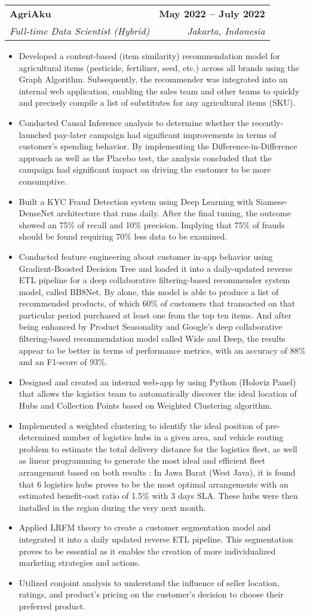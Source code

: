 \documentclass[letterpaper,11pt]{article}
\makeatletter
\newcommand{\resumeItem}[1]{
	\item\small{
		{#1 \vspace{-2pt}}
	}
}
\newcommand{\resumeSubheading}[4]{
	\vspace{-2pt}\item
	\begin{tabular*}{1.0\textwidth}[t]{l@{\extracolsep{\fill}}r}
		\textbf{#1} & \textbf{\small #2} \\
		\textit{\small#3} & \textit{\small #4} \\
	\end{tabular*}\vspace{-7pt}
}
\newcommand{\resumeItemListStart}{\begin{itemize}}
\newcommand{\resumeItemListEnd}{\end{itemize}\vspace{-5pt}}
\makeatother
\begin{document}
	\resumeSubheading
	{AgriAku}{May 2022 -- July 2022}
	{Full-time Data Scientist (Hybrid)}{Jakarta, Indonesia}
	\resumeItemListStart
	\resumeItem{Developed a content-based (item similarity) recommendation model for agricultural items (pesticide, fertilizer, seed, etc.) across all brands using the Graph Algorithm. Subsequently, the recommender was integrated into an internal web application, enabling the sales team and other teams to quickly and precisely compile a list of substitutes for any agricultural items (SKU). }
	\resumeItem{Conducted Causal Inference analysis to determine whether the recently-launched pay-later campaign had significant improvements in terms of customer's spending behavior. By implementing the Difference-in-Difference approach as well as the Placebo test, the analysis concluded that the campaign had significant impact on driving the customer to be more consumptive.}
	\resumeItem{Built a KYC Fraud Detection system using Deep Learning with Siamese-DenseNet architecture that runs daily. After the final tuning, the outcome showed an 75\% of recall and 10\% precision. Implying that 75\% of frauds should be found requiring 70\% less data to be examined.}
	\resumeItem{Conducted feature engineering about customer in-app behavior using Gradient-Boosted Decision Tree and loaded it into a daily-updated reverse ETL pipeline for a deep collaborative filtering-based recommender system model, called BB8Net. By alone, this model is able to produce a list of recommended products, of which 60\% of customers that transacted on that particular period purchased at least one from the top ten items. And after being enhanced by Product Seasonality and Google's deep collaborative filtering-based recommendation model called Wide and Deep, the results appear to be better in terms of performance metrics, with an accuracy of 88\% and an F1-score of 93\%.}
	\resumeItem{Designed and created an internal web-app by using Python (Holoviz Panel) that allows the logistics team to automatically discover the ideal location of Hubs and Collection Points based on Weighted Clustering algorithm.}
	\resumeItem{Implemented a weighted clustering to identify the ideal position of pre-determined number of logistics hubs in a given area, and vehicle routing problem to estimate the total delivery distance for the logistics fleet, as well as linear programming to generate the most ideal and efficient fleet arrangement based on both results : In Jawa Barat (West Java), it is found that 6 logistics hubs proves to be the most optimal arrangements with an estimated benefit-cost ratio of 1.5\% with 3 days SLA. These hubs were then installed in the region during the very next month.}
	\resumeItem{Applied LRFM theory to create a customer segmentation model and integrated it into a daily updated reverse ETL pipeline. This segmentation proves to be essential as it enables the creation of more individualized marketing strategies and actions.}
	\resumeItem{Utilized conjoint analysis to understand the influence of seller location, ratings, and product's pricing on the customer's decision to choose their preferred product.}
	\resumeItemListEnd
\end{document}
